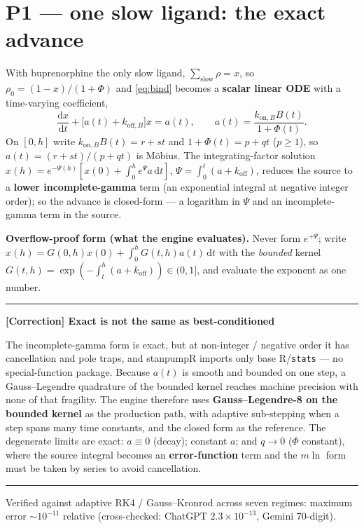 \documentclass[11pt]{article}
\newenvironment{correction}[1]
  {\par\vspace{0.3em}\noindent\textcolor{corrcol}{\rule{\linewidth}{0.4pt}}\par
   \noindent\textbf{\textcolor{corrcol}{[Correction] #1}}\par\nopagebreak\vspace{0.2em}}
  {\par\noindent\textcolor{corrcol}{\rule{\linewidth}{0.4pt}}\par\vspace{0.3em}}
\newcommand{\dd}[2]{\frac{\mathrm{d}#1}{\mathrm{d}#2}}
\newcommand{\kon}[1][]{k_{\mathrm{on}#1}}
\newcommand{\koff}[1][]{k_{\mathrm{off}#1}}
\newcommand{\rhoz}{\rho_0}
\begin{document}
\section{P1 --- one slow ligand: the exact advance}

With buprenorphine the only slow ligand, $\sum_{\mathrm{slow}}\rho=x$, so
$\rhoz=(1-x)/(1+\Phi)$ and \eqref{eq:bind} becomes a \textbf{scalar linear ODE}
with a time-varying coefficient,
%
\begin{equation}
\dd{x}{t}+\bigl[a(t)+\koff[,B]\bigr]x=a(t),\qquad
a(t)=\frac{\kon[,B]B(t)}{1+\Phi(t)} .
\label{eq:scalar}
\end{equation}
%
On $[0,h]$ write $\kon[,B]B(t)=r+st$ and $1+\Phi(t)=p+qt$ ($p\ge1$), so
$a(t)=(r+st)/(p+qt)$ is M\"obius. The integrating-factor solution
$x(h)=e^{-\Psi(h)}[x(0)+\int_0^h e^{\Psi}a\,\mathrm dt]$, $\Psi=\int_0^t(a+\koff)$,
reduces the source to a \textbf{lower incomplete-gamma} term (an exponential
integral at negative integer order); so the advance is closed-form --- a
logarithm in $\Psi$ and an incomplete-gamma term in the source.

\textbf{Overflow-proof form (what the engine evaluates).} Never form
$e^{+\Psi}$; write $x(h)=G(0,h)x(0)+\int_0^h G(t,h)a(t)\,\mathrm dt$ with the
\emph{bounded} kernel $G(t,h)=\exp(-\!\int_t^h(a+\koff))\in(0,1]$, and evaluate the
exponent as one number.

\begin{correction}{Exact is not the same as best-conditioned}
The incomplete-gamma form is exact, but at non-integer / negative order it has
cancellation and pole traps, and stanpumpR imports only base R/\texttt{stats} ---
no special-function package. Because $a(t)$ is smooth and bounded on one step, a
Gauss--Legendre quadrature of the bounded kernel reaches machine precision with
none of that fragility. The engine therefore uses \textbf{Gauss--Legendre-8 on
the bounded kernel} as the production path, with adaptive sub-stepping when a
step spans many time constants, and the closed form as the reference. The
degenerate limits are exact: $a\equiv0$ (decay); constant $a$; and $q\to0$
($\Phi$ constant), where the source integral becomes an \textbf{error-function}
term and the $m\ln$ form must be taken by series to avoid cancellation.
\end{correction}

Verified against adaptive RK4 / Gauss--Kronrod across seven regimes: maximum
error $\sim\!10^{-11}$ relative (cross-checked: ChatGPT $2.3\times10^{-13}$,
Gemini 70-digit).
\end{document}
